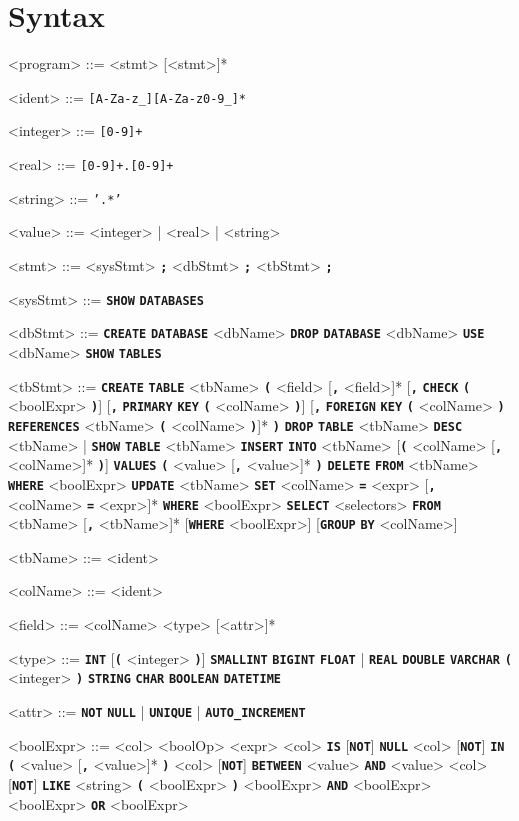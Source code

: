 \documentclass{article}
\renewcommand{\t}[1]{\texttt{\textbf{#1}}}
\begin{document}
\section{Syntax}
\setlength{\grammarindent}{10em}
\begin{grammar}

<program> ::= <stmt> [<stmt>]*

<ident> ::= \texttt{[A-Za-z_][A-Za-z0-9_]*}

<integer> ::= \texttt{[0-9]+}

<real> ::= \texttt{[0-9]+.[0-9]+}

<string> ::= \texttt{'.*'}

<value> ::= <integer> | <real> | <string>

<stmt> ::= <sysStmt> \t{;}
\alt <dbStmt> \t{;}
\alt <tbStmt> \t{;}

<sysStmt> ::= \t{SHOW} \t{DATABASES}

<dbStmt> ::= \t{CREATE} \t{DATABASE} <dbName>
\alt \t{DROP} \t{DATABASE} <dbName>
\alt \t{USE} <dbName>
\alt \t{SHOW} \t{TABLES}

<tbStmt> ::= \t{CREATE} \t{TABLE} <tbName> \t{(}
    <field> [\t{,} <field>]*
    [\t{,} \t{CHECK} \t{(} <boolExpr> \t{)}]
    [\t{,} \t{PRIMARY} \t{KEY} \t{(} <colName> \t{)}]
    [\t{,} \t{FOREIGN} \t{KEY} \t{(} <colName> \t{)} \t{REFERENCES} <tbName> \t{(} <colName> \t{)}]* \t{)}
\alt \t{DROP} \t{TABLE} <tbName>
\alt \t{DESC} <tbName> | \t{SHOW} \t{TABLE} <tbName>
\alt \t{INSERT} \t{INTO} <tbName> [\t{(} <colName> [\t{,} <colName>]* \t{)}] \t{VALUES} \t{(} <value> [\t{,} <value>]* \t{)}
\alt \t{DELETE} \t{FROM} <tbName> \t{WHERE} <boolExpr>
\alt \t{UPDATE} <tbName> \t{SET} <colName> \t{=} <expr> [\t{,} <colName> \t{=} <expr>]* \t{WHERE} <boolExpr>
\alt \t{SELECT} <selectors> \t{FROM} <tbName> [\t{,} <tbName>]* [\t{WHERE} <boolExpr>] [\t{GROUP} \t{BY} <colName>]

<tbName> ::= <ident>

<colName> ::= <ident>

<field> ::= <colName> <type> [<attr>]*

<type> ::= \t{INT} [\t{(} <integer> \t{)}]
\alt \t{SMALLINT}
\alt \t{BIGINT}
\alt \t{FLOAT} | \t{REAL}
\alt \t{DOUBLE}
\alt \t{VARCHAR} \t{(} <integer> \t{)}
\alt \t{STRING}
\alt \t{CHAR}
\alt \t{BOOLEAN}
\alt \t{DATETIME}

<attr> ::= \t{NOT} \t{NULL} | \t{UNIQUE} | \t{AUTO_INCREMENT}

<boolExpr> ::= <col> <boolOp> <expr>
\alt <col> \t{IS} [\t{NOT}] \t{NULL}
\alt <col> [\t{NOT}] \t{IN} \t{(} <value> [\t{,} <value>]* \t{)}
\alt <col> [\t{NOT}] \t{BETWEEN} <value> \t{AND} <value>
\alt <col> [\t{NOT}] \t{LIKE} <string>
\alt \t{(} <boolExpr> \t{)}
\alt <boolExpr> \t{AND} <boolExpr>
\alt <boolExpr> \t{OR} <boolExpr>


\end{grammar}
\end{document}
